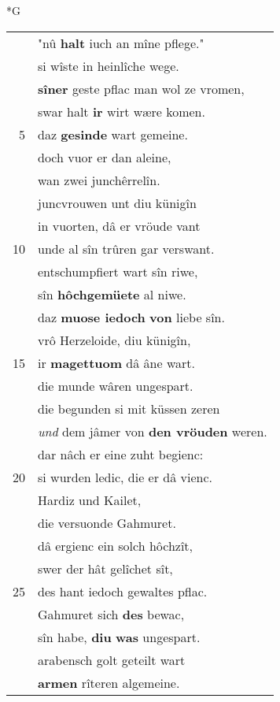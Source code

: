 \documentclass[8pt,a4paper,notitlepage]{article}
\begin{document}
\newpage
\begin{table}[ht]
\begin{minipage}[t]{0.5\linewidth}
\small
\begin{center}*G
\end{center}
\begin{tabular}{rl}
 & "nû \textbf{halt} iuch an mîne pflege."\\ 
 & si wîste in heinlîche wege.\\ 
 & \textbf{sîner} geste pflac man wol ze vromen,\\ 
 & swar halt \textbf{ir} wirt wære komen.\\ 
5 & daz \textbf{gesinde} wart gemeine.\\ 
 & doch vuor er dan aleine,\\ 
 & wan zwei junchêrrelîn.\\ 
 & juncvrouwen unt diu künigîn\\ 
 & in vuorten, dâ er vröude vant\\ 
10 & unde al sîn trûren gar verswant.\\ 
 & entschumpfiert wart sîn riwe,\\ 
 & sîn \textbf{hôchgemüete} al niwe.\\ 
 & daz \textbf{muose iedoch} \textbf{von} liebe sîn.\\ 
 & vrô Herzeloide, diu künigîn,\\ 
15 & ir \textbf{magettuom} dâ âne wart.\\ 
 & die munde wâren ungespart.\\ 
 & die begunden si mit küssen zeren\\ 
 & \textit{und} dem jâmer von \textbf{den vröuden} weren.\\ 
 & dar nâch er eine zuht begienc:\\ 
20 & si wurden ledic, die er dâ vienc.\\ 
 & Hardiz und Kailet,\\ 
 & die versuonde Gahmuret.\\ 
 & dâ ergienc ein solch hôchzît,\\ 
 & swer der hât gelîchet sît,\\ 
25 & des hant iedoch gewaltes pflac.\\ 
 & Gahmuret sich \textbf{des} bewac,\\ 
 & sîn habe, \textbf{diu} \textbf{was} ungespart.\\ 
 & arabensch golt geteilt wart\\ 
 & \textbf{armen} rîteren algemeine.\\ 

\end{tabular}
\end{minipage}
\end{table}
\end{document}
